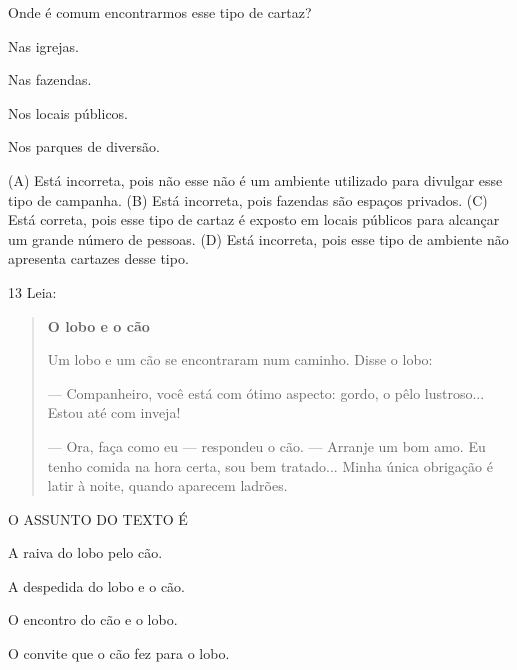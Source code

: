 Onde é comum encontrarmos esse tipo de cartaz?

\begin{minipage}{.5\textwidth}
\begin{escolha}
\item Nas igrejas.

\item Nas fazendas.

\item Nos locais públicos.

\item Nos parques de diversão.
\end{escolha}
\end{minipage}

(A) Está incorreta, pois não esse não é um ambiente utilizado para divulgar esse tipo de campanha.
(B) Está incorreta, pois fazendas são espaços privados.
(C) Está correta, pois esse tipo de cartaz é exposto em locais
públicos para alcançar um grande número de pessoas.
(D) Está incorreta, pois esse tipo de ambiente não apresenta cartazes desse tipo.

\num{13} Leia:


\begin{quote}
\textbf{O lobo e o cão}

Um lobo e um cão se encontraram num caminho. Disse o lobo:

--- Companheiro, você está com ótimo aspecto: gordo, o pêlo lustroso...
Estou até com inveja!

--- Ora, faça como eu --- respondeu o cão. --- Arranje um bom amo.
Eu tenho comida na hora certa, sou bem tratado...
Minha única obrigação é latir à noite, quando aparecem ladrões.
\end{quote}


O ASSUNTO DO TEXTO É

\begin{escolha}
\item A raiva do lobo pelo cão.

\item A despedida do lobo e o cão.

\item O encontro do cão e o lobo.

\item O convite que o cão fez para o lobo.
\end{escolha}

